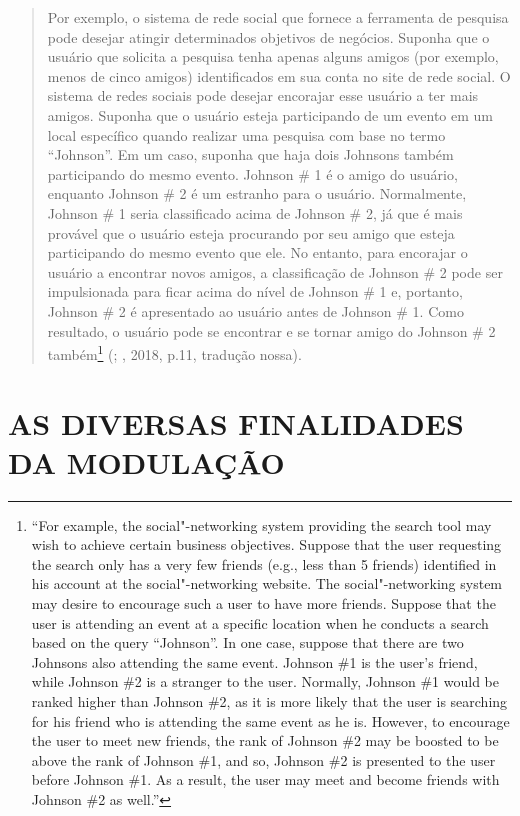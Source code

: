 \begin{quote}
Por exemplo, o sistema de rede social que fornece a ferramenta de
pesquisa pode desejar atingir determinados objetivos de negócios.
Suponha que o usuário que solicita a pesquisa tenha apenas alguns amigos
(por exemplo, menos de cinco amigos) identificados em sua conta no site
de rede social. O sistema de redes sociais pode desejar encorajar esse
usuário a ter mais amigos. Suponha que o usuário esteja participando de
um evento em um local específico quando realizar uma pesquisa com base
no termo ``Johnson''. Em um caso, suponha que haja dois Johnsons também
participando do mesmo evento. Johnson \# 1 é o amigo do usuário,
enquanto Johnson \# 2 é um estranho para o usuário. Normalmente, Johnson
\# 1 seria classificado acima de Johnson \# 2, já que é mais provável
que o usuário esteja procurando por seu amigo que esteja participando do
mesmo evento que ele. No entanto, para encorajar o usuário a encontrar
novos amigos, a classificação de Johnson \# 2 pode ser impulsionada para
ficar acima do nível de Johnson \# 1 e, portanto, Johnson \# 2 é
apresentado ao usuário antes de Johnson \# 1. Como resultado, o usuário
pode se encontrar e se tornar amigo do Johnson \# 2 também\footnote{``For
  example, the social"-networking system providing the search tool may
  wish to achieve certain business objectives. Suppose that the user
  requesting the search only has a very few friends (e.g., less than 5
  friends) identified in his account at the social"-networking website.
  The social"-networking system may desire to encourage such a user to
  have more friends. Suppose that the user is attending an event at a
  specific location when he conducts a search based on the query
  ``Johnson''. In one case, suppose that there are two Johnsons also
  attending the same event. Johnson \#1 is the user's friend, while
  Johnson \#2 is a stranger to the user. Normally, Johnson \#1 would be
  ranked higher than Johnson \#2, as it is more likely that the user is
  searching for his friend who is attending the same event as he is.
  However, to encourage the user to meet new friends, the rank of
  Johnson \#2 may be boosted to be above the rank of Johnson \#1, and
  so, Johnson \#2 is presented to the user before Johnson \#1. As a
  result, the user may meet and become friends with Johnson \#2 as
  well.''} (; , 2018, p.11, tradução nossa).
\end{quote}

\section{AS DIVERSAS FINALIDADES DA MODULAÇÃO}

